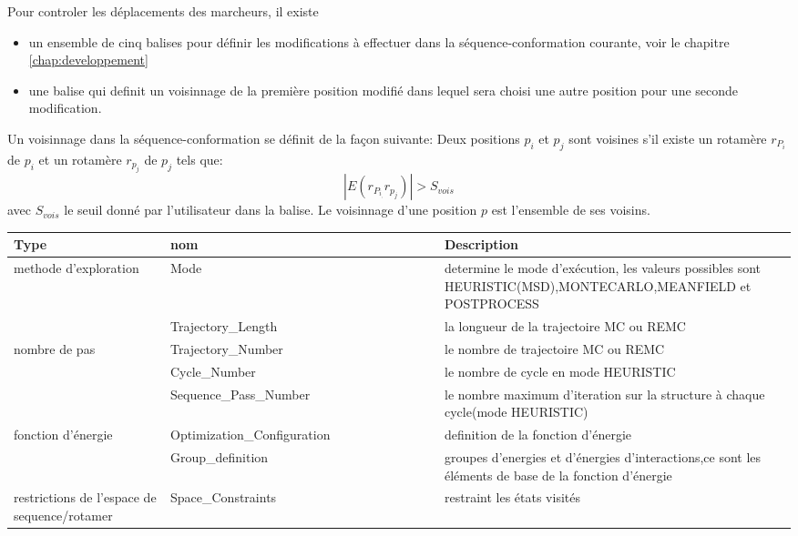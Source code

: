 \begin{enumerate}
Pour controler les déplacements des marcheurs, il existe 
\begin{itemize}
\item un ensemble de cinq  balises pour définir les modifications à effectuer dans la séquence-conformation courante, voir le chapitre \ref{chap:developpement}
\item une balise qui definit un voisinnage de la première position modifié dans lequel sera choisi une autre position pour une seconde modification.
\end{itemize}
Un voisinnage dans la séquence-conformation se définit de la façon suivante:
\label{\ref{para:voisin}}
Deux positions $p_i$ et $p_j$ sont voisines s'il existe un rotamère $r_P_i$ de $p_i$ et un rotamère $r_p_j$ de $p_j$ tels que:
\begin{displaymath}
 | E(r_P_i_,r_p_j) | > S_{vois}
\end{displaymath} 
avec $S_{vois}$ le seuil donné par l'utilisateur dans la balise.
Le voisinnage d'une position $p$ est l'ensemble de ses voisins.




    \begin{table}[!htbp]
      \centering

      \begin{tabular}{|p{0.2\linewidth}|p{0.35\linewidth}|p{0.45\linewidth}|}

        \hline
        Type   & nom & Description \\
        \hline
          methode  d'exploration & Mode &  determine  le mode d'exécution, les valeurs possibles sont HEURISTIC(MSD),MONTECARLO,MEANFIELD et POSTPROCESS  \\  \hline    
                        & Trajectory\_Length  &  la longueur de la trajectoire MC ou REMC\\  \cline{2-3}
        nombre de pas & Trajectory\_Number  &  le nombre de trajectoire  MC ou REMC  \\  \cline{2-3}
                        & Cycle\_Number  &    le nombre de cycle en mode HEURISTIC   \\ \cline{2-3}  
                        & Sequence\_Pass\_Number  &  le nombre maximum d'iteration sur  la structure à chaque cycle(mode HEURISTIC)    \\ \hline  

        fonction d'énergie &  Optimization\_Configuration &   definition de la fonction d'énergie\\               \cline{2-3}
                        &  Group\_definition &   groupes  d'energies et d'énergies d'interactions,ce sont les éléments de base de la fonction d'énergie\\  \hline  
        restrictions de l'espace de  sequence/rotamer & Space\_Constraints   &  restraint les états visités \\ \hline                
                         

\end{tabular}
\end{table}
\end{enumerate}
